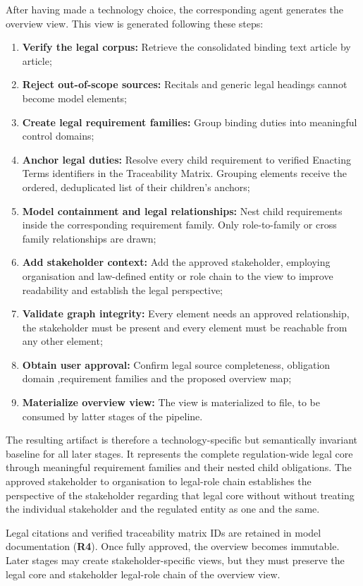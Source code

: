After having made a technology choice, the corresponding agent generates the overview view. This view is generated following these steps:
\begin{enumerate}
    \item \textbf{Verify the legal corpus:} Retrieve the consolidated binding text article by article;
    \item \textbf{Reject out-of-scope sources:} Recitals and generic legal headings cannot become model elements; 
    \item \textbf{Create legal requirement families:} Group binding duties into meaningful control domains;
    \item \textbf{Anchor legal duties:} Resolve every child requirement to verified Enacting Terms identifiers in the Traceability Matrix. Grouping elements receive the ordered, deduplicated list of their children's anchors;
    \item \textbf{Model containment and legal relationships:} Nest child requirements inside the corresponding requirement family. Only role-to-family or cross family relationships are drawn;
    \item \textbf{Add stakeholder context:} Add the approved stakeholder, employing organisation and law-defined entity or role chain to the view to improve readability and establish the legal perspective;
    \item \textbf{Validate graph integrity:} Every element needs an approved relationship, the stakeholder must be present and every element must be reachable from any other element;
    \item \textbf{Obtain user approval:} Confirm legal source completeness, obligation domain ,requirement families and the proposed overview map;
    \item \textbf{Materialize overview view:} The view is materialized to file, to be consumed by latter stages of the pipeline.
\end{enumerate}

The resulting artifact is therefore a technology-specific but semantically invariant baseline for all later stages. It represents the complete regulation-wide legal core through meaningful requirement families and their nested child obligations. The approved stakeholder to organisation to legal-role chain establishes the perspective of the stakeholder regarding that legal core without without treating the individual stakeholder and the regulated entity as one and the same.

Legal citations and verified traceability matrix \ac{ID}s are retained in model documentation (\textbf{R4}). Once fully approved, the overview becomes immutable. Later stages may create stakeholder-specific views, but they must preserve the legal core and stakeholder legal-role chain of the overview view.


